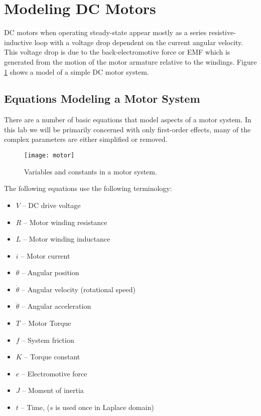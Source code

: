 \documentclass[11pt,fleqn]{book} %
\begin{document}
\section{Modeling DC Motors}

DC motors when operating steady-state appear mostly as a series resistive-inductive loop with a voltage drop dependent on the current angular velocity. This voltage drop is due to the back-electromotive force or EMF which is generated from the motion of the motor armature relative to the windings. Figure \ref{motor_sys} shows a model of a simple DC motor system. 

\subsection{Equations Modeling a Motor System}

There are a number of basic equations that model aspects of a motor system. In this lab we will be primarily concerned with only first-order effects, many of the complex parameters are either simplified or removed. 

\begin{figure}[tb]
    \centering\texttt{[image: motor]}
    \caption{Variables and constants in a motor system.}
    \label{motor_sys}
\end{figure}

The following equations use the following terminology:
\begin{itemize}
    \item $V$ -- DC drive voltage
    \item $R$ -- Motor winding resistance
    \item $L$ -- Motor winding inductance 
    \item $i$ -- Motor current 
    \item $\theta$ -- Angular position
    \item $\dot{\theta}$ -- Angular velocity (rotational speed)
    \item $\ddot{\theta}$ -- Angular acceleration
    \item $T$ -- Motor Torque
    \item $f$ -- System friction
    \item $K$ -- Torque constant
    \item $e$ -- Electromotive force
    \item $J$ -- Moment of inertia
    \item $t$ -- Time, ($s$ is used once in Laplace domain) 
\end{itemize}
\end{document}
